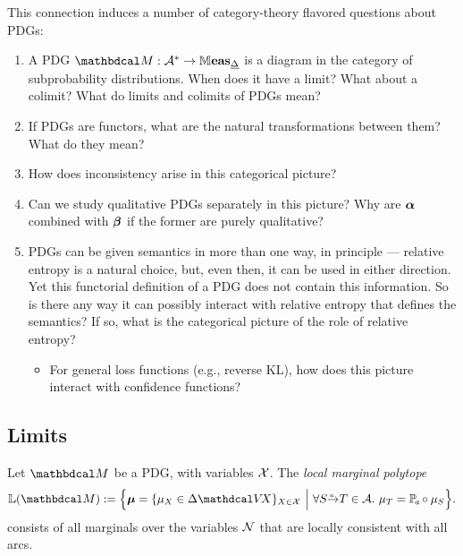 This connection induces a number of category-theory flavored questions about PDGs:
\begin{enumerate}
    \item A PDG $\dg M : \mathcal A^* \to \Meas_{\underline\Delta}$ is a diagram in the category of subprobability distributions. When does it have a limit? What about a colimit? What do limits and colimits of PDGs mean? 

    \item If PDGs are functors, what are the natural transformations between them? What do they mean? 
    \item How does inconsistency arise in this categorical picture? 
    \item Can we study qualitative PDGs separately in this picture? Why are $\boldsymbol\alpha$ combined with $\boldsymbol\beta$ if the former are purely qualitative? 
    
    
    \item 
    PDGs can be given semantics in more than one way, in principle --- relative entropy is a natural choice, but, even then, it can be used in either direction.  Yet this functorial definition of a PDG does not contain this information.
    So is there any way it can possibly interact with relative entropy that defines the semantics? 
    If so, what is the categorical picture of the role of relative entropy?
    \begin{itemize}
        \item For general loss functions (e.g., reverse KL),
         how does this picture interact with confidence functions?  
    \end{itemize}
\end{enumerate}



\subsection{Limits}

\begin{defn}
    Let $\dg M$ be a PDG, with variables $\mathcal X$. 
    The \emph{local marginal polytope}
    \begin{equation}
        \mathbb L(\dg M) := 
            \Big\{ 
                \bmu = 
                \{ \mu_X \in \Delta \V\! X  
                \}_{X \in \X}
            ~\Big|~
                \forall \ed aST \in \Ar.~ \mu_T = \p_a \circ \mu_S 
            \Big\}.
    \end{equation}
    consists of all marginals over the variables $\mathcal N$ that are locally consistent with all arcs. 
\end{defn}

